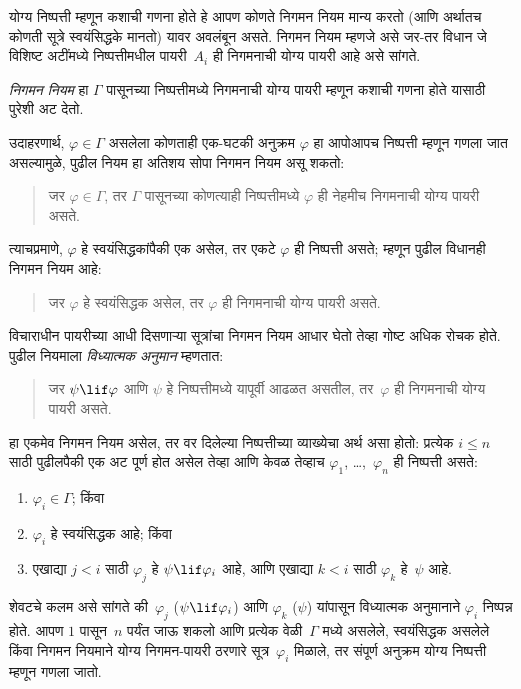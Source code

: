 योग्य निष्पत्ती म्हणून कशाची गणना होते हे आपण कोणते निगमन नियम
मान्य करतो (आणि अर्थातच कोणती सूत्रे स्वयंसिद्धके मानतो) यावर अवलंबून
असते. निगमन नियम म्हणजे असे जर-तर विधान जे विशिष्ट अटींमध्ये
निष्पत्तीमधील पायरी~$A_i$ ही निगमनाची योग्य पायरी आहे असे सांगते.

\begin{defn}[निगमन नियम]
\emph{निगमन नियम} हा $\Gamma$ पासूनच्या निष्पत्तीमध्ये निगमनाची
योग्य पायरी म्हणून कशाची गणना होते यासाठी पुरेशी अट देतो.
\end{defn}

उदाहरणार्थ, $\varphi \in \Gamma$ असलेला कोणताही एक-घटकी अनुक्रम $\varphi$ हा
आपोआपच निष्पत्ती म्हणून गणला जात असल्यामुळे, पुढील नियम हा
अतिशय सोपा निगमन नियम असू शकतो:
\begin{quote}
  जर $\varphi \in \Gamma$, तर $\Gamma$ पासूनच्या कोणत्याही निष्पत्तीमध्ये $\varphi$ ही नेहमीच निगमनाची योग्य पायरी असते.
\end{quote}
त्याचप्रमाणे, $\varphi$ हे स्वयंसिद्धकांपैकी एक असेल, तर एकटे $\varphi$ ही
निष्पत्ती असते; म्हणून पुढील विधानही निगमन नियम आहे:
\begin{quote}
  जर $\varphi$ हे स्वयंसिद्धक असेल, तर $\varphi$ ही निगमनाची योग्य पायरी असते.
\end{quote}
विचाराधीन पायरीच्या आधी दिसणाऱ्या सूत्रांचा निगमन नियम आधार घेतो
तेव्हा गोष्ट अधिक रोचक होते. पुढील नियमाला \emph{विध्यात्मक अनुमान}
म्हणतात:
\begin{quote}
  जर $\psi \lif \varphi$ आणि $\psi$ हे निष्पत्तीमध्ये यापूर्वी आढळत असतील,
  तर~$\varphi$ ही निगमनाची योग्य पायरी असते.
\end{quote}
हा एकमेव निगमन नियम असेल, तर वर दिलेल्या निष्पत्तीच्या व्याख्येचा
अर्थ असा होतो: प्रत्येक $i \le n$ साठी पुढीलपैकी एक अट पूर्ण होत असेल
तेव्हा आणि केवळ तेव्हाच $\varphi_1$, \dots,~$\varphi_n$ ही निष्पत्ती असते:
\begin{enumerate}
\item $\varphi_i \in \Gamma$; किंवा
\item $\varphi_i$ हे स्वयंसिद्धक आहे; किंवा
\item एखाद्या $j < i$ साठी $\varphi_j$ हे $\psi \lif \varphi_i$ आहे, आणि एखाद्या
  $k < i$ साठी $\varphi_k$ हे~$\psi$ आहे.
\end{enumerate}
शेवटचे कलम असे सांगते की~$\varphi_j$ ($\psi \lif \varphi_i$) आणि $\varphi_k$ ($\psi$)
यांपासून विध्यात्मक अनुमानाने $\varphi_i$ निष्पन्न होते. आपण $1$ पासून~$n$
पर्यंत जाऊ शकलो आणि प्रत्येक वेळी~$\Gamma$ मध्ये असलेले, स्वयंसिद्धक
असलेले किंवा निगमन नियमाने योग्य निगमन-पायरी ठरणारे सूत्र~$\varphi_i$
मिळाले, तर संपूर्ण अनुक्रम योग्य निष्पत्ती म्हणून गणला जातो.


